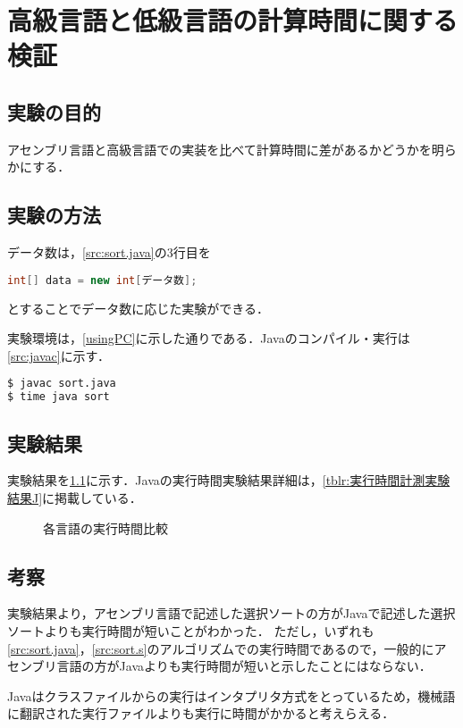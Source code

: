 \chapter{高級言語と低級言語の計算時間に関する検証}
\section{実験の目的}
アセンブリ言語と高級言語での実装を比べて計算時間に差があるかどうかを明らかにする．
\section{実験の方法}
データ数は，\ref{src:sort.java}の3行目を
\begin{lstlisting}[caption={}, label={}, language={Java}, frame={none},numbers={none}]
int[] data = new int[データ数];
\end{lstlisting}
とすることでデータ数に応じた実験ができる．\par
実験環境は，\ref{usingPC}に示した通りである．{\ttfamily Java}のコンパイル・実行は\ref{src:javac}に示す．
\begin{lstlisting}[caption={{\ttfamily Java}コンパイル・実行時間の計測}, label={src:javac}, language={Bash},frame={single},numbers={none}]
$ javac sort.java
$ time java sort
\end{lstlisting}
\section{実験結果}
実験結果を\ref{fig:比較}に示す．{\ttfamily Java}の実行時間実験結果詳細は，\ref{tblr:実行時間計測実験結果J}に掲載している．
\begin{figure}[htb]
    \centering
    \caption{各言語の実行時間比較}
    \label{fig:比較}
\end{figure}
\section{考察}
実験結果より，アセンブリ言語で記述した選択ソートの方が{\ttfamily Java}で記述した選択ソートよりも実行時間が短いことがわかった．
ただし，いずれも\ref{src:sort.java}，\ref{src:sort.s}のアルゴリズムでの実行時間であるので，一般的にアセンブリ言語の方が{\ttfamily Java}よりも実行時間が短いと示したことにはならない．\par
{\ttfamily Java}はクラスファイルからの実行はインタプリタ方式をとっているため，機械語に翻訳された実行ファイルよりも実行に時間がかかると考えらえる．